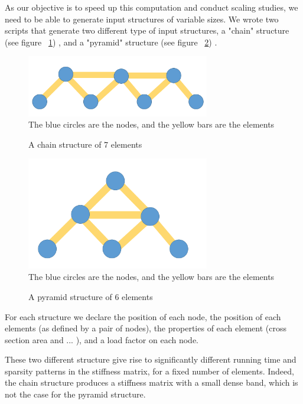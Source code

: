 \documentclass[11pt]{article}
\begin{document}
As our objective is to speed up this computation and conduct scaling studies, we need to be able to generate input structures of variable sizes.
We wrote two scripts that generate two different type of input structures, a "chain" structure (see figure ~\ref{fig:chain}) , and a "pyramid" structure (see figure ~\ref{fig:pyramid}) .


\begin{figure}[h]
\begin{center}

\caption{A chain structure of 7 elements}
\includegraphics[width=8cm]{chain}
\label{fig:chain}
\\
The blue circles are the nodes, and the yellow bars are the elements
\end{center}

\end{figure}


\begin{figure}[h]
\begin{center}

\caption{A pyramid structure of 6 elements}
\includegraphics[width=8cm]{pyramid}
\label{fig:pyramid}
\\
The blue circles are the nodes, and the yellow bars are the elements
\end{center}

\end{figure}



For each structure we declare the position of each node, the position of each elements (as defined by a pair of nodes), the properties of each element (cross section area and ... ), and a load factor on each node.

These two different structure give rise to significantly different running time and sparsity patterns in the stiffness matrix, for a fixed number of elements. Indeed, the chain structure produces a stiffness matrix with a small dense band, which is not the case for the pyramid structure.
\end{document}
